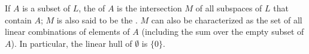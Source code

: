 If $A$ is a subset of $L$, the  of $A$ is the intersection $M$ of all subspaces of $L$ that contain $A$; $M$ is also said to be the . $M$ can also be characterized as the set of all linear combinations of elements of $A$ (including the sum over the empty subset of $A$). In particular, the linear hull of $\emptyset$ is $\{0\}$.
